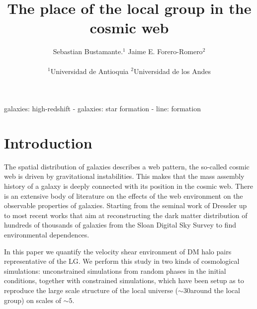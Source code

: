 \documentclass[usenatbib]{mn2e}
\begin{document}
\title[LG Environment]{The place of the local group in the cosmic web}
\author[S. Bustamante and J.E. Forero-Romero]{
\parbox[t]{\textwidth}{\raggedright 
  Sebastian Bustamante.$^{1}$ 
  Jaime E. Forero-Romero$^{2}$ 
}
\vspace*{6pt}\\
$^{1}$Universidad de Antioquia
$^{2}$Universidad de los Andes
}

\maketitle

\begin{abstract}

\end{abstract}

\begin{keywords}
galaxies: high-redshift - galaxies: star formation - line: formation
\end{keywords}



\section{Introduction}
\label{sec:introduction}


The spatial distribution of galaxies describes a web pattern, the 
so-called cosmic web is driven by gravitational instabilities. This makes 
that the mass assembly history of a galaxy is deeply connected with its 
position in the cosmic web. There is an extensive body of literature on 
the effects of the web environment on the observable properties of 
galaxies. Starting from the seminal work of Dressler up to most recent 
works that aim at reconstructing the dark matter distribution of hundreds 
of thousands of galaxies from the Sloan Digital Sky Survey to find 
environmental dependences. 


In this paper we quantify the velocity shear environment of DM halo pairs
representative of the LG. We perform this study in two kinds of 
cosmological simulations: unconstrained simulations from random phases in 
the initial conditions, together with constrained simulations, which have 
been setup as to reproduce the large scale structure of the local universe
($\sim 30$\hMpc around the local group) on scales of $\sim 5$\hMpc. 
\end{document}
